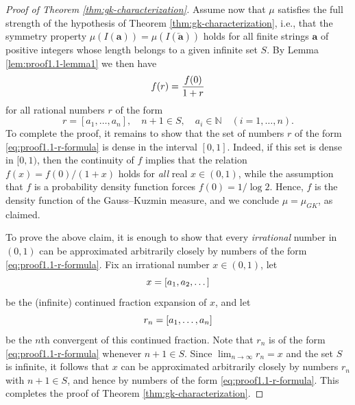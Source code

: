\documentclass[10pt]{article}
\theoremstyle{definition}
\numberwithin{equation}{section}
\numberwithin{lemma}{section}
\newcommand{\NN}{\mathbb{N}}
\newcommand{\bfa}{\mathbf{a}}
\newcommand{\bfar}{\overleftarrow{\bfa}}
\begin{document}
\begin{proof}[Proof of Theorem \ref{thm:gk-characterization}]
Assume now that $\mu$
satisfies the full strength of the hypothesis of Theorem 
\ref{thm:gk-characterization}, i.e., that the symmetry property 
$\mu(I(\bfa))=\mu(I(\bfar))$ holds
for all finite strings $\bfa$ of positive integers whose length belongs to a
given infinite set $S$.  
By Lemma \ref{lem:proof1.1-lemma1} we then have
\begin{equation}
\notag
f(r)=\frac{f(0)}{1+r} 
\end{equation}
for all rational numbers $r$ of the form
\begin{equation}
\label{eq:proof1.1-r-formula}
r=[a_1,\dots,a_n],\quad n+1\in S,\quad a_i\in\NN \quad (i=1,\dots,n).
\end{equation}
To complete the proof, it
remains to show that the set of numbers $r$ of the form 
\eqref{eq:proof1.1-r-formula}
is
dense in the interval $[0,1]$. Indeed, if this set is dense in $[0,1)$,
then the continuity of $f$ implies that the relation
$f(x)=f(0)/(1+x)$ holds for \emph{all} real $x\in(0,1)$, while the assumption 
that $f$ is a probability density function forces 
$f(0)=1/\log 2$. Hence, $f$ is the density function of the
Gauss--Kuzmin measure, and we conclude $\mu=\mu_{GK}$, as claimed.

To prove the above claim, it is enough to show that every
\emph{irrational} number in $(0,1)$ can be approximated arbitrarily
closely by numbers of the form \eqref{eq:proof1.1-r-formula}.  
Fix an irrational number $x\in(0,1)$, let 
\begin{equation}
\notag
x=[a_1,a_2,\dots]
\end{equation}
be the (infinite) continued fraction expansion of $x$, and let
\begin{equation}
\notag
r_n=[a_1,\dots,a_n]
\end{equation}
be the $n$th convergent of this continued fraction. Note that $r_n$ is
of the form \eqref{eq:proof1.1-r-formula} whenever $n+1\in S$. Since 
$\lim_{n\to\infty}r_n=x$ and the set $S$ is infinite, it follows that 
$x$ can be approximated arbitrarily closely by numbers $r_n$ with
$n+1\in S$, and hence by numbers of the form
 \eqref{eq:proof1.1-r-formula}.  
This completes the proof of Theorem \ref{thm:gk-characterization}.
\end{proof}

\end{document}
